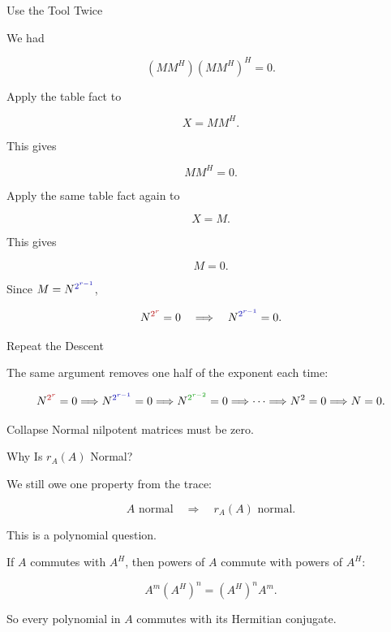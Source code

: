 \documentclass[10pt]{beamer}
\theoremstyle{definition}
\newcommand{\rd}[1]{{\color{red!70!black}#1}}
\newcommand{\bl}[1]{{\color{blue!70!black}#1}}
\newcommand{\gn}[1]{{\color{green!60!black}#1}}
\begin{document}
\begin{frame}[shrink=6]{Use the Tool Twice}

We had

$$
(MM^H)(MM^H)^H=0.
$$

\vfill\pause

Apply the table fact to

$$
X=MM^H.
$$

This gives

$$
MM^H=0.
$$

\vfill\pause

Apply the same table fact again to

$$
X=M.
$$

This gives

$$
M=0.
$$

\vfill

Since $M=N^{\bl{2^{r-1}}}$,

$$
N^{\rd{2^r}}=0\quad\Longrightarrow\quad N^{\bl{2^{r-1}}}=0.
$$

\end{frame}


\begin{frame}{Repeat the Descent}

The same argument removes one half of the exponent each time:

$$
N^{\rd{2^r}}=0
\Longrightarrow
N^{\bl{2^{r-1}}}=0
\Longrightarrow
N^{\gn{2^{r-2}}}=0
\Longrightarrow
\cdots
\Longrightarrow
N^{2}=0
\Longrightarrow
N=0.
$$

\vfill

\begin{block}{Collapse}
Normal nilpotent matrices must be zero.
\end{block}

\end{frame}


\begin{frame}{Why Is $r_A(A)$ Normal?}

We still owe one property from the trace:

$$
A\text{ normal}\quad\Longrightarrow\quad r_A(A)\text{ normal}.
$$

\vfill\pause

This is a polynomial question.

\vfill

If $A$ commutes with $A^H$, then powers of $A$ commute with powers of $A^H$:

$$
A^m(A^H)^n=(A^H)^nA^m.
$$

\vfill

So every polynomial in $A$ commutes with its Hermitian conjugate.

\end{frame}
\end{document}
